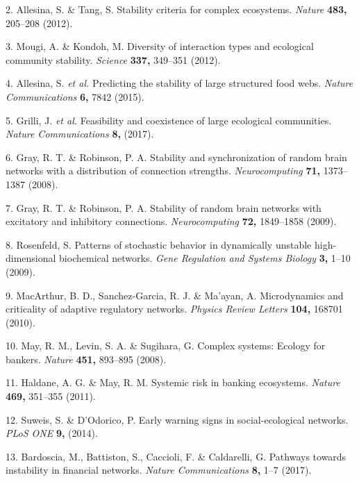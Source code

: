 \documentclass[]{article}
\begin{document}
\hypertarget{ref-Allesina2012}{}
2. Allesina, S. \& Tang, S. Stability criteria for complex ecosystems.
\emph{Nature} \textbf{483,} 205--208 (2012).

\hypertarget{ref-Mougi2012}{}
3. Mougi, A. \& Kondoh, M. Diversity of interaction types and ecological
community stability. \emph{Science} \textbf{337,} 349--351 (2012).

\hypertarget{ref-Allesina2015}{}
4. Allesina, S. \emph{et al.} Predicting the stability of large
structured food webs. \emph{Nature Communications} \textbf{6,} 7842
(2015).

\hypertarget{ref-Grilli2017}{}
5. Grilli, J. \emph{et al.} Feasibility and coexistence of large
ecological communities. \emph{Nature Communications} \textbf{8,} (2017).

\hypertarget{ref-Gray2008}{}
6. Gray, R. T. \& Robinson, P. A. Stability and synchronization of
random brain networks with a distribution of connection strengths.
\emph{Neurocomputing} \textbf{71,} 1373--1387 (2008).

\hypertarget{ref-Gray2009}{}
7. Gray, R. T. \& Robinson, P. A. Stability of random brain networks
with excitatory and inhibitory connections. \emph{Neurocomputing}
\textbf{72,} 1849--1858 (2009).

\hypertarget{ref-Rosenfeld2009}{}
8. Rosenfeld, S. Patterns of stochastic behavior in dynamically unstable
high-dimensional biochemical networks. \emph{Gene Regulation and Systems
Biology} \textbf{3,} 1--10 (2009).

\hypertarget{ref-MacArthur2010}{}
9. MacArthur, B. D., Sanchez-Garcia, R. J. \& Ma'ayan, A. Microdynamics
and criticality of adaptive regulatory networks. \emph{Physics Review
Letters} \textbf{104,} 168701 (2010).

\hypertarget{ref-May2008}{}
10. May, R. M., Levin, S. A. \& Sugihara, G. Complex systems: Ecology
for bankers. \emph{Nature} \textbf{451,} 893--895 (2008).

\hypertarget{ref-Haldane2011}{}
11. Haldane, A. G. \& May, R. M. Systemic risk in banking ecosystems.
\emph{Nature} \textbf{469,} 351--355 (2011).

\hypertarget{ref-Suweis2014}{}
12. Suweis, S. \& D'Odorico, P. Early warning signs in social-ecological
networks. \emph{PLoS ONE} \textbf{9,} (2014).

\hypertarget{ref-Bardoscia2017}{}
13. Bardoscia, M., Battiston, S., Caccioli, F. \& Caldarelli, G.
Pathways towards instability in financial networks. \emph{Nature
Communications} \textbf{8,} 1--7 (2017).
\end{document}
